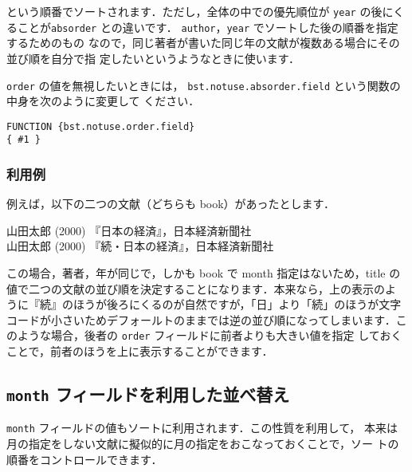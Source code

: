 \documentclass[a4j,10pt]{jarticle}
\begin{document}
\noindent という順番でソートされます．ただし，全体の中での優先順位が 
\texttt{year} の後にくることが\texttt{absorder} との違いです．
\texttt{author}，\texttt{year} でソートした後の順番を指定するためのもの
なので，同じ著者が書いた同じ年の文献が複数ある場合にその並び順を自分で指
定したいというようなときに使います．

\texttt{order} の値を無視したいときには，
\texttt{bst.notuse.absorder.field} という関数の中身を次のように変更して
ください．
\begin{screen}
\begin{verbatim}
FUNCTION {bst.notuse.order.field}
{ #1 }
\end{verbatim}
\end{screen}


\subsubsection{利用例}

例えば，以下の二つの文献（どちらも book）があったとします．
\begin{screen}
\begin{flushleft}
 山田太郎 (2000) 『日本の経済』，日本経済新聞社\\
 山田太郎 (2000) 『続・日本の経済』，日本経済新聞社
\end{flushleft}
\end{screen}

この場合，著者，年が同じで，しかも book で month 指定はないため，title 
の値で二つの文献の並び順を決定することになります．本来なら，上の表示のよ
うに『続』のほうが後ろにくるのが自然ですが，「日」より「続」のほうが文字
コードが小さいためデフォールトのままでは逆の並び順になってしまいます．こ
のような場合，後者の \texttt{order} フィールドに前者よりも大きい値を指定
しておくことで，前者のほうを上に表示することができます．

\subsection{\texttt{month} フィールドを利用した並べ替え}

\texttt{month} フィールドの値もソートに利用されます．この性質を利用して，
本来は月の指定をしない文献に擬似的に月の指定をおこなっておくことで，ソー
トの順番をコントロールできます．
\end{document}
